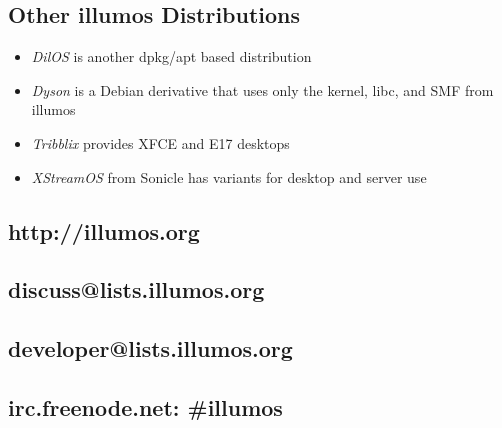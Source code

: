 \documentclass[11pt,foldmark,notumble]{leaflet}
\begin{document}
\subsection{Other illumos Distributions}
\begin{itemize}
\item \emph{DilOS} is another dpkg/apt based distribution
\item \emph{Dyson} is a Debian derivative that uses only the kernel,
  libc, and SMF from illumos
\item \emph{Tribblix} provides XFCE and E17 desktops
\item \emph{XStreamOS} from Sonicle has variants for desktop and
  server use
\end{itemize}

\subsection{http://illumos.org}
\subsection{discuss@lists.illumos.org}
\subsection{developer@lists.illumos.org}
\subsection{irc.freenode.net: \#illumos}
\end{document}
